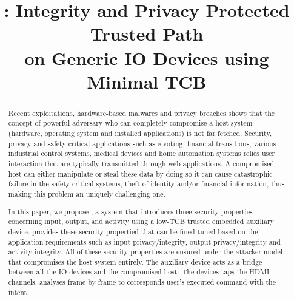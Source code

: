 

\newif\ifpaper
\papertrue


\newif\ifdesperatetime

\graphicspath{{images/}}


\title{\name: Integrity and Privacy Protected Trusted Path \\on Generic IO Devices using Minimal TCB}


\begin{abstract}
 
Recent exploitations, hardware-based malwares and privacy breaches shows that the concept of powerful adversary who can completely compromise a host system (hardware, operating system and installed applications) is not far fetched. Security, privacy and safety critical applications such as e-voting, financial transitions, various industrial control systems, medical devices and home automation systems relies user interaction that are typically transmitted through web applications. A compromised host can either manipulate or steal these data by doing so it can cause catastrophic failure in the safety-critical systems, theft of identity and/or financial information, thus making this problem an uniquely challenging one.

In this paper, we propose \name, a system that introduces three security properties concerning input, output, and activity using a low-TCB trusted embedded auxiliary device. \name provides these security propertied that can be fined tuned based on the application requirements such as input privacy/integrity, output privacy/integrity and activity integrity. All of these security properties are ensured under the attacker model that compromises the host system entirely. The auxiliary device acts as a bridge between all the IO devices and the compromised host. The devices taps the HDMI channels, analyses frame by frame to corresponds user's executed command with the intent. 
\end{abstract}

\maketitle













